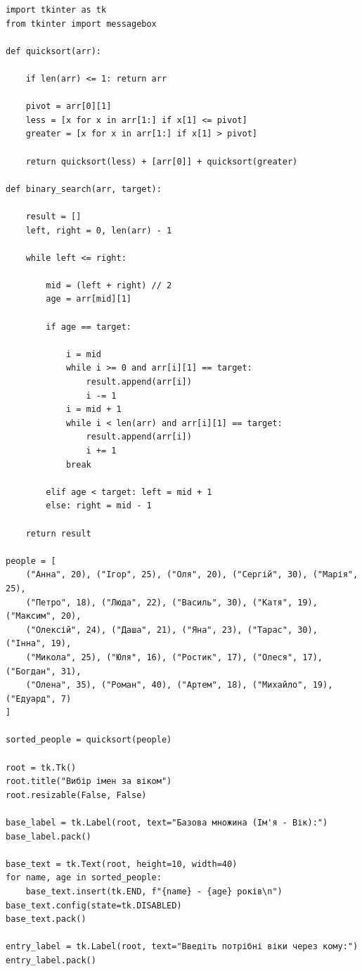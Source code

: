 \documentclass[12pt,a4paper]{article}
\begin{document}
    {

    \begin{verbatim}
import tkinter as tk
from tkinter import messagebox

def quicksort(arr):

    if len(arr) <= 1: return arr

    pivot = arr[0][1]
    less = [x for x in arr[1:] if x[1] <= pivot]
    greater = [x for x in arr[1:] if x[1] > pivot]

    return quicksort(less) + [arr[0]] + quicksort(greater)

def binary_search(arr, target):

    result = []
    left, right = 0, len(arr) - 1

    while left <= right:
    
        mid = (left + right) // 2
        age = arr[mid][1]

        if age == target:

            i = mid
            while i >= 0 and arr[i][1] == target:
                result.append(arr[i])
                i -= 1
            i = mid + 1
            while i < len(arr) and arr[i][1] == target:
                result.append(arr[i])
                i += 1
            break

        elif age < target: left = mid + 1
        else: right = mid - 1

    return result

people = [
    ("Анна", 20), ("Ігор", 25), ("Оля", 20), ("Сергій", 30), ("Марія", 25),
    ("Петро", 18), ("Люда", 22), ("Василь", 30), ("Катя", 19), ("Максим", 20),
    ("Олексій", 24), ("Даша", 21), ("Яна", 23), ("Тарас", 30), ("Інна", 19),
    ("Микола", 25), ("Юля", 16), ("Ростик", 17), ("Олеся", 17), ("Богдан", 31),
    ("Олена", 35), ("Роман", 40), ("Артем", 18), ("Михайло", 19),("Едуард", 7)
]

sorted_people = quicksort(people)

root = tk.Tk()
root.title("Вибір імен за віком")
root.resizable(False, False)

base_label = tk.Label(root, text="Базова множина (Ім'я - Вік):")
base_label.pack()

base_text = tk.Text(root, height=10, width=40)
for name, age in sorted_people:
    base_text.insert(tk.END, f"{name} - {age} років\n")
base_text.config(state=tk.DISABLED)
base_text.pack()

entry_label = tk.Label(root, text="Введіть потрібні віки через кому:")
entry_label.pack()


\end{verbatim}}
\end{document}
